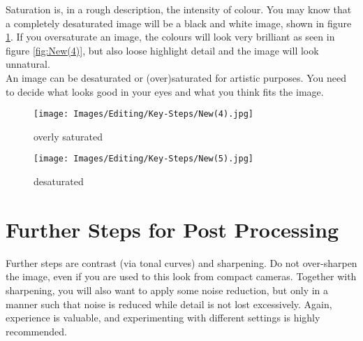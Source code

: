 Saturation is, in a rough description, the intensity of colour. You may know that a completely desaturated image will be a black and white image, shown in figure \ref{fig:New(5)}. If you oversaturate an image, the colours will look very brilliant as seen in figure \ref{fig:New(4)}, but also loose highlight detail and the image will look unnatural.
\\[\baselineskip]
An image can be desaturated or (over)saturated for artistic purposes. You need to decide what looks good in your eyes and what you think fits the image.

\begin{figure}[htbp]
\begin{minipage}{.5\textwidth}
	\centering
		\texttt{[image: Images/Editing/Key-Steps/New(4).jpg]}
	\caption{overly saturated}
	\label{fig:New(4)}
\end{minipage}
\begin{minipage}{.5\textwidth}
	\centering
		\texttt{[image: Images/Editing/Key-Steps/New(5).jpg]}
	\caption{desaturated}
	\label{fig:New(5)}
\end{minipage}
\end{figure}


\section{Further Steps for Post Processing}

Further steps are contrast (via tonal curves) and sharpening. Do not over-sharpen the image, even if you are used to this look from compact cameras. Together with sharpening, you will also want to apply some noise reduction, but only in a manner such that noise is reduced while detail is not lost excessively. Again, experience is valuable, and experimenting with different settings is highly recommended.
